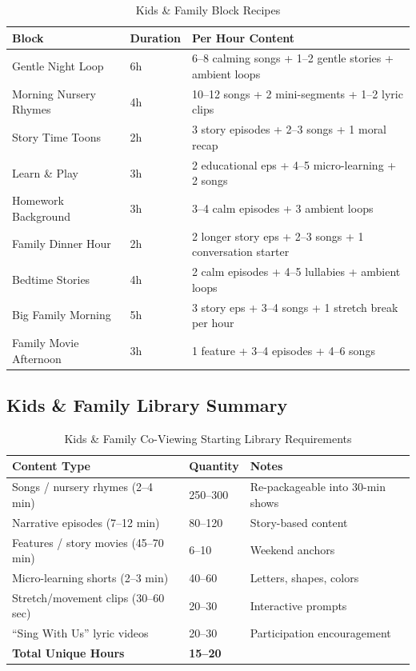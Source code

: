 \documentclass[12pt,letterpaper,twoside]{report}
\begin{document}
\begin{table}[H]
\centering
\caption{Kids \& Family Block Recipes}
\label{tab:kids-recipes}
\begin{tabular}{@{}L{3.5cm}L{2cm}L{8cm}@{}}
\toprule
\textbf{Block} & \textbf{Duration} & \textbf{Per Hour Content} \\
\midrule
Gentle Night Loop & 6h & 6--8 calming songs + 1--2 gentle stories + ambient loops \\
Morning Nursery Rhymes & 4h & 10--12 songs + 2 mini-segments + 1--2 lyric clips \\
Story Time Toons & 2h & 3 story episodes + 2--3 songs + 1 moral recap \\
Learn \& Play & 3h & 2 educational eps + 4--5 micro-learning + 2 songs \\
Homework Background & 3h & 3--4 calm episodes + 3 ambient loops \\
Family Dinner Hour & 2h & 2 longer story eps + 2--3 songs + 1 conversation starter \\
Bedtime Stories & 4h & 2 calm episodes + 4--5 lullabies + ambient loops \\
Big Family Morning & 5h & 3 story eps + 3--4 songs + 1 stretch break per hour \\
Family Movie Afternoon & 3h & 1 feature + 3--4 episodes + 4--6 songs \\
\bottomrule
\end{tabular}
\end{table}

\subsection{Kids \& Family Library Summary}

\begin{table}[H]
\centering
\caption{Kids \& Family Co-Viewing Starting Library Requirements}
\label{tab:kids-library}
\begin{tabular}{@{}L{6cm}R{3cm}L{5cm}@{}}
\toprule
\textbf{Content Type} & \textbf{Quantity} & \textbf{Notes} \\
\midrule
Songs / nursery rhymes (2--4 min) & 250--300 & Re-packageable into 30-min shows \\
Narrative episodes (7--12 min) & 80--120 & Story-based content \\
Features / story movies (45--70 min) & 6--10 & Weekend anchors \\
Micro-learning shorts (2--3 min) & 40--60 & Letters, shapes, colors \\
Stretch/movement clips (30--60 sec) & 20--30 & Interactive prompts \\
``Sing With Us'' lyric videos & 20--30 & Participation encouragement \\
\midrule
\textbf{Total Unique Hours} & \textbf{15--20} & \\
\bottomrule
\end{tabular}
\end{table}
\end{document}
